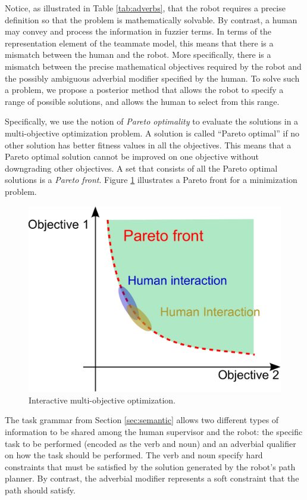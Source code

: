 
Notice, as illustrated in Table \ref{tab:adverbs}, that the robot requires a precise definition so that the problem is mathematically solvable.
By contrast, a human may convey and process the information in fuzzier terms.
In terms of the representation element of the teammate model, this means that there is a mismatch between the human and the robot.
More specifically, there is a mismatch between the precise mathematical objectives required by the robot and the possibly ambiguous adverbial modifier specified by the human.
To solve such a problem, we propose a posterior method that allows the robot to specify a range of possible solutions, and allows the human to select from this range.

Specifically, we use the notion of \emph{Pareto optimality} to evaluate the solutions in a multi-objective optimization problem.
A solution is called ``Pareto optimal'' if no other solution has better fitness values in all the objectives.
This means that a Pareto optimal solution cannot be improved on one objective without downgrading other objectives.
A set that consists of all the Pareto optimal solutions is a \emph{Pareto front}.
Figure \ref{fig:moo} illustrates a Pareto front for a minimization problem.

\begin{figure}
\centering
\includegraphics[width=0.4\linewidth]{./images/moo}
\caption{Interactive multi-objective optimization.}
\label{fig:moo}
\end{figure}

The task grammar from Section \ref{sec:semantic} allows two different types of information to be shared among the human supervisor and the robot:
the specific task to be performed (encoded as the verb and noun) and an adverbial qualifier on how the task should be performed.
The verb and noun specify hard constraints that must be satisfied by the solution generated by the robot's path planner.
By contrast, the adverbial modifier represents a soft constraint that the path should satisfy.

